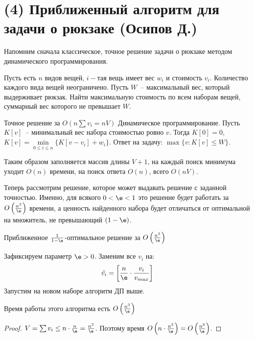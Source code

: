 \section{(4) Приближенный алгоритм для задачи о рюкзаке (Осипов Д.)}
Напомним сначала классическое, точное решение задачи о рюкзаке методом динамического программирования.

\begin{problem*}
	Пусть есть $n$ видов вещей, $i-$тая вещь имеет вес $w_i$ и стоимость $v_i$. Количество каждого вида вещей неограничено. Пусть $W$~-- максимальный вес, который выдерживает рюкзак. Найти максимальную стоимость по всем наборам вещей, суммарный вес которого не превышает $W$.
\end{problem*}

\begin{algodescription}{Точное решение за $O\left(n\sum{v_i}=nV\right)$} Динамическое программирование. Пусть $K[v]$~-- минимальный вес набора стоимостью ровно $v$. Тогда $K[0] = 0$, $K[v] = \min\limits_{0\le i\le n}\{K[v-v_i] + w_i\}$. Ответ на задачу: $\max\{v : K[v] \leq W\}$.

Таким образом заполняется массив длины $V+1$, на каждый поиск минимума уходит $O(n)$ времени, на поиск ответа $O(n)$, всего $O(nV)$. 
\end{algodescription}

Теперь рассмотрим решение, которое может выдавать решение с заданной точностью. Именно, для всякого $0 < \e < 1$ это решение будет работать за $O\left(\frac{n^3}{\e}\right)$ времени, а ценность найденного набора будет отличаться от оптимальной на множитель, не превышающий $(1-\e)$.

\begin{algodescription}{Приближенное $\frac{1}{1-\e}$-оптимальное решение за $O\left(\frac{n^3}{\e}\right)$}

Зафиксируем параметр $\e>0$. Заменим все $v_i$ на: $$\hat{v_i} = \left[\frac{n}{\e} \cdot \frac{v_i}{v_{max}}\right]$$ Запустим на новом наборе алгоритм ДП выше. 
\end{algodescription}

\begin{theorem*}
    Время работы этого алгоритма есть $O\left(\frac{n^3}{\e}\right)$
\end{theorem*}
\begin{proof}
    $V = \sum v_i \leq n\cdot \frac{n}{\e} = \frac{n^2}{\e}$. Поэтому время $O\left(n \cdot \frac{n^2}{\e}\right) = O\left(\frac{n^3}{\e}\right)$.
\end{proof}

